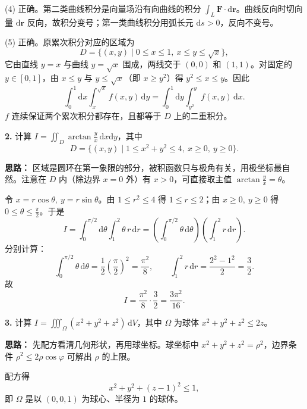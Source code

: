 (4) 正确。第二类曲线积分是向量场沿有向曲线的积分 $\int_L\mathbf F\cdot\mathrm{d}\mathbf r$。曲线反向时切向量 $\mathrm{d}\mathbf r$ 反向，故积分变号；第一类曲线积分用弧长元 $\mathrm{d}s>0$，反向不变号。

(5) 正确。原累次积分对应的区域为
\[
D=\{(x,y)\mid 0\le x\le1,\ x\le y\le\sqrt x\},
\]
它由直线 $y=x$ 与曲线 $y=\sqrt x$ 围成，两线交于 $(0,0)$ 和 $(1,1)$。对固定的 $y\in[0,1]$，由 $x\le y$ 与 $y\le\sqrt x$（即 $x\ge y^2$）得 $y^2\le x\le y$。因此
\[
\int_0^1\mathrm{d}x\int_x^{\sqrt x}f(x,y)\,\mathrm{d}y
=\int_0^1\mathrm{d}y\int_{y^2}^{y}f(x,y)\,\mathrm{d}x.
\]
$f$ 连续保证两个累次积分都存在，且都等于 $D$ 上的二重积分。


\else \answerarea[10] \fi%

\textbf{2.} 计算 $\displaystyle I=\iint_D \arctan\frac{y}{x}\,\mathrm{d}x\mathrm{d}y$，其中
\[
D=\{(x,y)\mid 1\le x^2+y^2\le4,\ x\ge0,\ y\ge0\}.
\]

\ifshowsolutions%
\textbf{思路：} 区域是圆环在第一象限的部分，被积函数只与极角有关，用极坐标最自然。注意在 $D$ 内（除边界 $x=0$ 外）有 $x>0$，可直接取主值 $\arctan\frac yx=\theta$。

令 $x=r\cos\theta,\ y=r\sin\theta$。由 $1\le r^2\le4$ 得 $1\le r\le2$；由 $x\ge0,\ y\ge0$ 得 $0\le\theta\le\frac{\pi}{2}$。于是
\[
I=\int_0^{\pi/2}\!\!\mathrm{d}\theta\int_1^2 \theta\, r\,\mathrm{d}r
=\left(\int_0^{\pi/2}\theta\,\mathrm{d}\theta\right)
\left(\int_1^2 r\,\mathrm{d}r\right).
\]
分别计算：
\[
\int_0^{\pi/2}\theta\,\mathrm{d}\theta
=\frac{1}{2}\left(\frac{\pi}{2}\right)^2=\frac{\pi^2}{8},
\qquad
\int_1^2 r\,\mathrm{d}r=\frac{2^2-1^2}{2}=\frac32.
\]
故
\[
I=\frac{\pi^2}{8}\cdot\frac32=\frac{3\pi^2}{16}.
\]

\else \answerarea[8] \fi%

\textbf{3.} 计算 $\displaystyle I=\iiint_\Omega (x^2+y^2+z^2)\,\mathrm{d}V$，其中 $\Omega$ 为球体 $x^2+y^2+z^2\le 2z$。

\ifshowsolutions%
\textbf{思路：} 先配方看清几何形状，再用球坐标。球坐标中 $x^2+y^2+z^2=\rho^2$，边界条件 $\rho^2\le2\rho\cos\varphi$ 可解出 $\rho$ 的上限。

配方得
\[
x^2+y^2+(z-1)^2\le1,
\]
即 $\Omega$ 是以 $(0,0,1)$ 为球心、半径为 $1$ 的球体。


